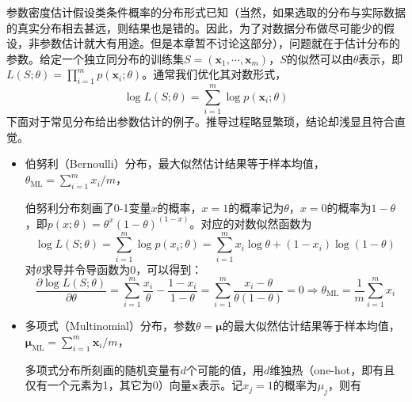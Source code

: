 \documentclass{article}
\begin{document}
	参数密度估计假设类条件概率的分布形式已知（当然，如果选取的分布与实际数据的真实分布相去甚远，则结果也是错的。因此，为了对数据分布做尽可能少的假设，非参数估计就大有用途。但是本章暂不讨论这部分），问题就在于估计分布的参数。给定一个独立同分布的训练集$S = (\bm{x}_1,\cdots,\bm{x}_m)$，$S$的似然可以由$\theta$表示，即$L(S;\theta) = \prod_{i=1}^m  p(\bm{x}_i;\theta)$。通常我们优化其对数形式，
	\begin{equation}
	\log L(S;\theta) = \sum_{i=1}^m \log p(\bm{x}_i;\theta)
	\end{equation}
下面对于常见分布给出参数估计的例子。推导过程略显繁琐，结论却浅显且符合直觉。

	\begin{itemize}
	\item [\textbf{1}] 伯努利（Bernoulli）分布，最大似然估计结果等于样本均值，$\theta_{\mathrm{ML}}=\sum_{i=1}^m x_i/m$，
	\vspace{1mm}
	\begin{scriptsize}
	\begin{spacing}{1.2}
	{\sffamily
	伯努利分布刻画了0-1变量$x$的概率，$x=1$的概率记为$\theta$，$x=0$的概率为$1-\theta$，即$p(x;\theta)=\theta^x(1-\theta)^{(1-x)}$。对应的对数似然函数为
	\begin{equation*}
	\log L(S;\theta) = \sum_{i=1}^m \log p(x_i;\theta) = \sum_{i=1}^m x_i\log \theta + (1-x_i)\log(1-\theta)
	\end{equation*}
对$\theta$求导并令导函数为0，可以得到：
	\begin{equation*}
	\frac{\partial \log L(S;\theta)}{\partial \theta} = \sum_{i=1}^m \frac{x_i}{\theta} - \frac{1-x_i}{1-\theta} = \sum_{i=1}^m \frac{x_i-\theta}{\theta(1-\theta)} = 0 \Longrightarrow	 \theta_{\mathrm{ML}}=\frac{1}{m}\sum_{i=1}^m x_i	
	\end{equation*}
	}
	\end{spacing}
	\end{scriptsize}
	\vspace{-4mm}
	
	\item [\textbf{2}] 多项式（Multinomial）分布，参数$\theta=\bm{\mu}$的最大似然估计结果等于样本均值，$\bm{\mu}_{\mathrm{ML}}=\sum_{i=1}^m \bm{x}_i/m$，
	
	\vspace{1mm}
	\begin{scriptsize}
	\begin{spacing}{1.2}
	{\sffamily
	多项式分布所刻画的随机变量有$d$个可能的值，用$d$维独热（one-hot，即有且仅有一个元素为1，其它为0）向量$\bm{x}$表示。记$x_j=1$的概率为$\mu_j$，则有
	
}
\end{spacing}
\end{scriptsize}
\end{itemize}
\end{document}
